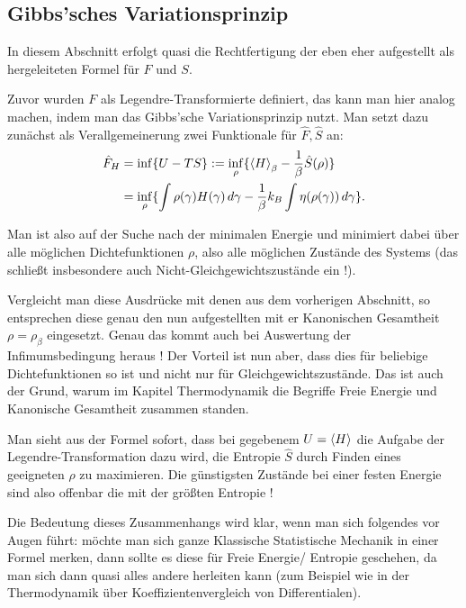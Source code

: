 	\subsection{Gibbs'sches Variationsprinzip}
In diesem Abschnitt erfolgt quasi die Rechtfertigung der eben eher aufgestellt als hergeleiteten Formel für $F$ und $S$.

Zuvor wurden $F$ als Legendre-Transformierte definiert, das kann man hier analog machen, indem man das Gibbs'sche Variationsprinzip nutzt. Man setzt dazu zunächst als Verallgemeinerung zwei Funktionale für $\hat{F}, \hat{S}$ an:
\begin{align}\label{key}
\hat{F}_H &= \inf \{U - T S\} := \inf_\rho\{\expval{H}_\beta - \frac{1}{\beta} \hat{S}(\rho)\}
\notag\\
&= \inf_\rho\{ \int \rho(\gamma) H(\gamma) \, d\gamma - \frac{1}{\beta} k_B \int \eta\qty(\rho(\gamma)) \, d\gamma \} .
\end{align}

Man ist also auf der Suche nach der minimalen Energie und minimiert dabei über alle möglichen Dichtefunktionen $\rho$, also alle möglichen Zustände des Systems (das schließt insbesondere auch Nicht-Gleichgewichtszustände ein !).

Vergleicht man diese Ausdrücke mit denen aus dem vorherigen Abschnitt, so entsprechen diese genau den nun aufgestellten mit er Kanonischen Gesamtheit $\rho = \rho_\beta$ eingesetzt. Genau das kommt auch bei Auswertung der Infimumsbedingung heraus ! Der Vorteil ist nun aber, dass dies für beliebige Dichtefunktionen so ist und nicht nur für Gleichgewichtszustände. Das ist auch der Grund, warum im Kapitel Thermodynamik die Begriffe Freie Energie und Kanonische Gesamtheit zusammen standen.

Man sieht aus der Formel sofort, dass bei gegebenem $U = \expval{H}$ die Aufgabe der Legendre-Transformation dazu wird, die Entropie $\hat{S}$ durch Finden eines geeigneten $\rho$ zu maximieren. Die günstigsten Zustände bei einer festen Energie sind also offenbar die mit der größten Entropie !


Die Bedeutung dieses Zusammenhangs wird klar, wenn man sich folgendes vor Augen führt: möchte man sich ganze Klassische Statistische Mechanik in einer Formel merken, dann sollte es diese für Freie Energie/ Entropie geschehen, da man sich dann quasi alles andere herleiten kann (zum Beispiel wie in der Thermodynamik über Koeffizientenvergleich von Differentialen).\\

